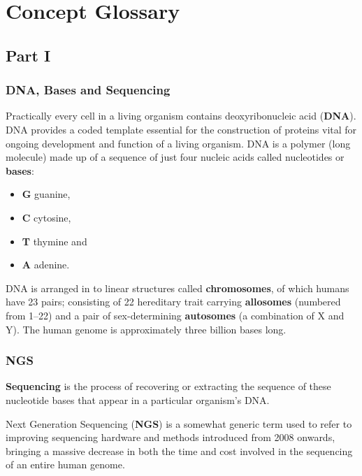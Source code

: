 \chapter{Concept Glossary}
\label{app:concepts}

\section{Part I}
\label{app:concepts-p1}
\subsection{DNA, Bases and Sequencing}

Practically every cell in a living organism contains deoxyribonucleic acid
(\textbf{DNA}).
DNA provides a coded template essential for the construction of proteins vital
for ongoing development and function of a living organism.
DNA is a polymer (long molecule) made up of a sequence of just four nucleic acids
called nucleotides or \textbf{bases}\citep{HMG-DNA}:

\begin{itemize}
    \item \textbf{G} guanine,
    \item \textbf{C} cytosine,
    \item \textbf{T} thymine and
    \item \textbf{A} adenine.
\end{itemize}

DNA is arranged in to linear structures called \textbf{chromosomes}, of which
humans have 23 pairs; consisting of 22 hereditary trait carrying
\textbf{allosomes} (numbered from 1--22) and a pair of sex-determining
\textbf{autosomes} (a combination of X and Y)\citep{HMG-Chrom}.  The human
genome is approximately three billion bases long.

\subsection{NGS}
\textbf{Sequencing} is the process of recovering or extracting the sequence of
these nucleotide bases that appear in a particular organism's DNA.

Next Generation Sequencing (\textbf{NGS}) is a somewhat generic term used to
refer to improving sequencing hardware and methods introduced from 2008 onwards,
bringing a massive decrease in both the time and cost involved in the sequencing
of an entire human genome\citep{genomegov:costs}.


